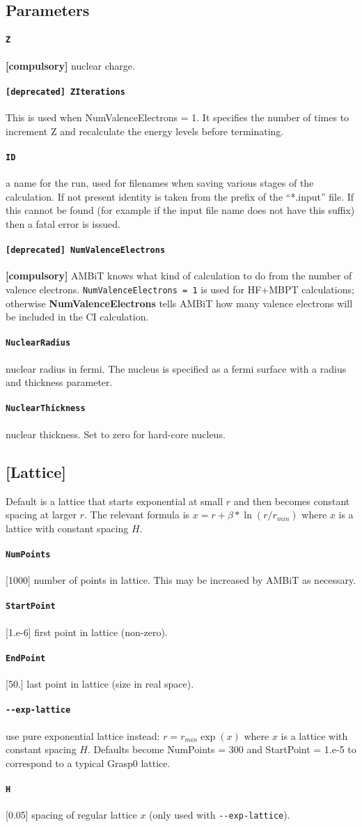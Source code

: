 \documentclass[a4paper,11pt]{article}
\newcommand{\option}[1]{\paragraph{\texttt{#1}}}
\begin{document}
\subsection{Parameters}

\option{Z} \textbf{[compulsory]} nuclear charge.

\option{[deprecated] ZIterations} This is used when NumValenceElectrons = 1. It specifies the number of times to increment Z and recalculate the energy levels before terminating.

\option{ID} a name for the run, used for filenames when saving various stages of the calculation. If not present identity is taken from the prefix of the ``*.input'' file. If this cannot be found (for example if the input file name does not have this suffix) then a fatal error is issued.

\option{[deprecated] NumValenceElectrons} \textbf{[compulsory]} AMBiT knows what kind of calculation to do from the number of valence electrons. \texttt{NumValenceElectrons = 1} is used for HF+MBPT calculations; otherwise \textbf{NumValenceElectrons} tells AMBiT how many valence electrons will be included in the CI calculation.

\option{NuclearRadius} nuclear radius in fermi. The nucleus is specified as a fermi surface with a radius and thickness parameter.

\option{NuclearThickness} nuclear thickness. Set to zero for hard-core nucleus.

\subsection*{[Lattice]}
Default is a lattice that starts exponential at small $r$ and then becomes constant spacing at larger $r$. The relevant formula is $x = r + \beta*\ln(r/r_{min})$ where $x$ is a lattice with constant spacing $H$.
\option{NumPoints} [1000] number of points in lattice. This may be increased by AMBiT as necessary.
\option{StartPoint} [1.e-6] first point in lattice (non-zero).
\option{EndPoint} [50.] last point in lattice (size in real space).

\option{-{}-exp-lattice} use pure exponential lattice instead: $r = r_{min}\exp(x)$ where $x$ is a lattice with constant spacing $H$. Defaults become NumPoints = 300 and StartPoint = 1.e-5 to correspond to a typical Grasp0 lattice.
\option{H} [0.05] spacing of regular lattice $x$ (only used with \texttt{-{}-exp-lattice}).

\end{document}
